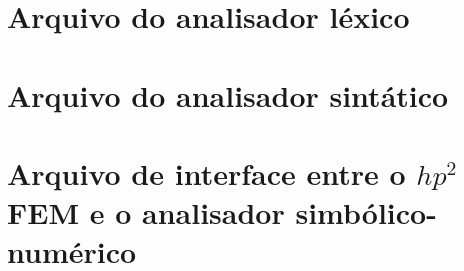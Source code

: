 \begin{center}
\label{ApendiceA}
\end{center}



\section{Arquivo do analisador léxico}\label{ApendiceA:Lex}




\section{Arquivo do analisador sintático}\label{ApendiceA:Sintatico}




\section{Arquivo de interface entre o $hp^2$FEM e o analisador
simbólico-numérico}\label{ApendiceA:Analisador}





% 
% 

